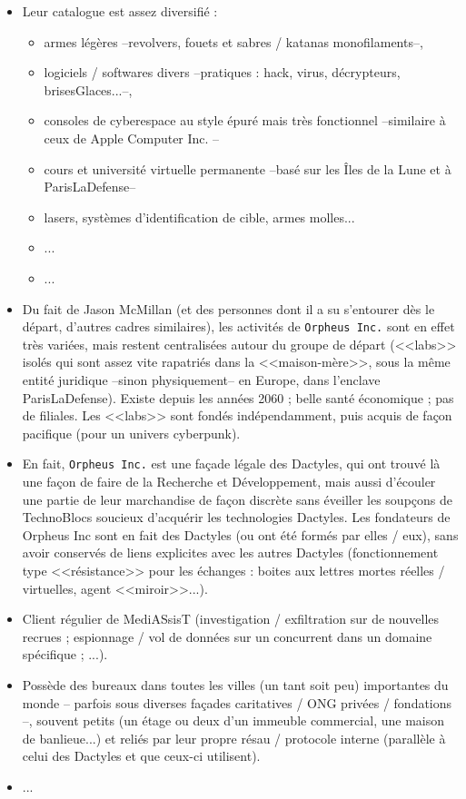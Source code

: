 \documentclass[11pt,twoside,a4paper]{article}
\begin{document}
\begin{itemize}
	\item Leur catalogue est assez diversifi{\'e} : 
	\begin{itemize}
		\item armes l{\'e}g{\`e}res --revolvers, fouets et sabres / katanas monofilaments--, 
		\item logiciels / softwares divers --pratiques : hack, virus, d{\'e}crypteurs, brisesGlaces...--, 
		\item consoles de cyberespace au style {\'e}pur{\'e} mais tr{\`e}s fonctionnel --similaire {\`a} ceux de Apple Computer Inc. --
		\item cours et universit{\'e} virtuelle permanente --bas{\'e} sur les {\^I}les de la Lune et {\`a} ParisLaDefense--
		\item lasers, syst{\`e}mes d'identification de cible, armes molles...
		\item ...
		\item ...
	\end{itemize}
	\item Du fait de Jason McMillan (et des personnes dont il a su s'entourer d{\`e}s le d{\'e}part, d'autres cadres similaires), les activit{\'e}s de \texttt{Orpheus Inc.} sont en effet tr{\`e}s vari{\'e}es, mais restent centralis{\'e}es autour du groupe de d{\'e}part (<<labs>> isol{\'e}s qui sont assez vite rapatri{\'e}s dans la <<maison-m{\`e}re>>, sous la m{\^e}me entit{\'e} juridique --sinon physiquement--  en Europe, dans l'enclave ParisLaDefense). Existe depuis les ann{\'e}es 2060 ; belle sant{\'e} {\'e}conomique ; pas de filiales. Les <<labs>> sont fond{\'e}s ind{\'e}pendamment, puis acquis de fa\c{c}on pacifique (pour un univers cyberpunk). 
	\item En fait, \texttt{Orpheus Inc.} est une fa\c{c}ade l{\'e}gale des Dactyles, qui ont trouv{\'e} l{\`a} une fa\c{c}on de faire de la Recherche et D{\'e}veloppement, mais aussi d'{\'e}couler une partie de leur marchandise de fa\c{c}on discr{\`e}te sans {\'e}veiller les soup\c{c}ons de TechnoBlocs soucieux d'acqu{\'e}rir les technologies Dactyles. Les fondateurs de Orpheus Inc sont en fait des Dactyles (ou ont {\'e}t{\'e} form{\'e}s par elles / eux), sans avoir conserv{\'e}s de liens explicites avec les autres Dactyles (fonctionnement type <<r{\'e}sistance>> pour les {\'e}changes : boites aux lettres mortes r{\'e}elles / virtuelles, agent <<miroir>>...). 
	\item Client r{\'e}gulier de MediASsisT (investigation / exfiltration sur de nouvelles recrues ; espionnage / vol de donn{\'e}es sur un concurrent dans un domaine sp{\'e}cifique ; ...).
	\item Poss{\`e}de des bureaux dans toutes les villes (un tant soit peu) importantes du monde -- parfois sous diverses fa\c{c}ades caritatives / ONG priv{\'e}es / fondations --, souvent petits (un {\'e}tage ou deux d'un immeuble commercial, une maison de banlieue...) et reli{\'e}s par leur propre r{\'e}sau / protocole interne (parall{\`e}le {\`a} celui des Dactyles et que ceux-ci utilisent).  
	\item ...
\end{itemize}
\end{document}
